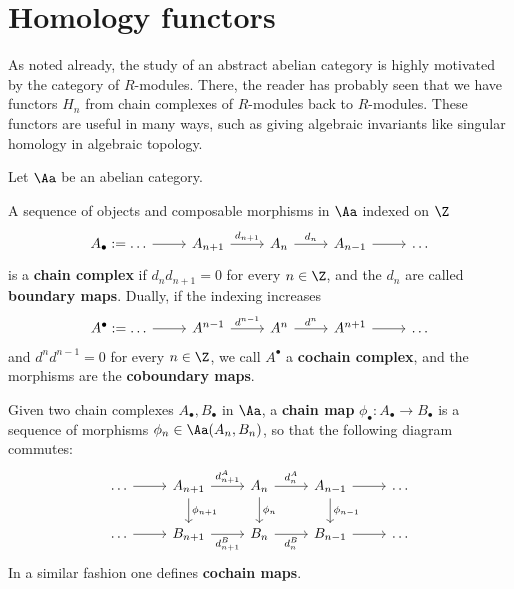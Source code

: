 
\section{Homology functors}

As noted already, the study of an abstract abelian category is highly motivated by the
category of $R$-modules. There, the reader has probably seen that we have functors 
$H_{n}$ from chain complexes of $R$-modules back to $R$-modules. 
These functors are useful in many ways,
such as giving algebraic invariants like singular homology in algebraic topology. 


Let $\Aa$ be an abelian category.

\begin{df}
    A sequence of objects and composable morphisms in $\Aa$ indexed on $\Z$
    \begin{equation*}
        \begin{tikzcd}
            A_{\bullet} := \dots \ar[r]
            & A_{n+1} \ar[r, "d_{n+1}"]
            & A_{n} \ar[r, "d_{n}"]
            & A_{n-1} \ar[r]
            & \dots
        \end{tikzcd}
    \end{equation*}
    is a \textbf{chain complex} if $d_{n}d_{n+1}=0$ for every $n \in \Z$,
    and the $d_{n}$ are called \textbf{boundary maps}.
    Dually, if the indexing increases
    \begin{equation*}
        \begin{tikzcd}
            A^{\bullet} := \dots \ar[r]
            & A^{n-1} \ar[r, "d^{n-1}"]
            & A^{n} \ar[r, "d^{n}"]
            & A^{n+1} \ar[r]
            & \dots
        \end{tikzcd}
    \end{equation*}
    and $d^{n}d^{n-1}=0$ for every $n \in \Z$,
    we call $A^{\bullet}$ a \textbf{cochain complex},
    and the morphisms are the \textbf{coboundary maps}.
\end{df}

\begin{df}
    Given two chain complexes $A_{\bullet}, B_{\bullet}$ in $\Aa$,
    a \textbf{chain map} $\phi_{\bullet} : A_{\bullet} \to B_{\bullet}$
    is a sequence of morphisms $\phi_{n} \in \Aa(A_{n}, B_{n})$,
    so that the following diagram commutes:
    \begin{equation*}
        \begin{tikzcd}
            \dots \ar[r] 
            & A_{n+1} \ar[d, "\phi_{n+1}"] \ar[r, "d_{n+1}^{A}"]
            & A_{n} \ar[d, "\phi_{n}"] \ar[r, "d_{n}^{A}"]
            & A_{n-1} \ar[d, "\phi_{n-1}"] \ar[r]
            & \dots \\
            \dots \ar[r] 
            & B_{n+1} \ar[r, "d_{n+1}^{B}"']
            & B_{n} \ar[r, "d_{n}^{B}"']
            & B_{n-1} \ar[r]
            & \dots
        \end{tikzcd}
    \end{equation*}
    In a similar fashion one defines \textbf{cochain maps}.
\end{df}

